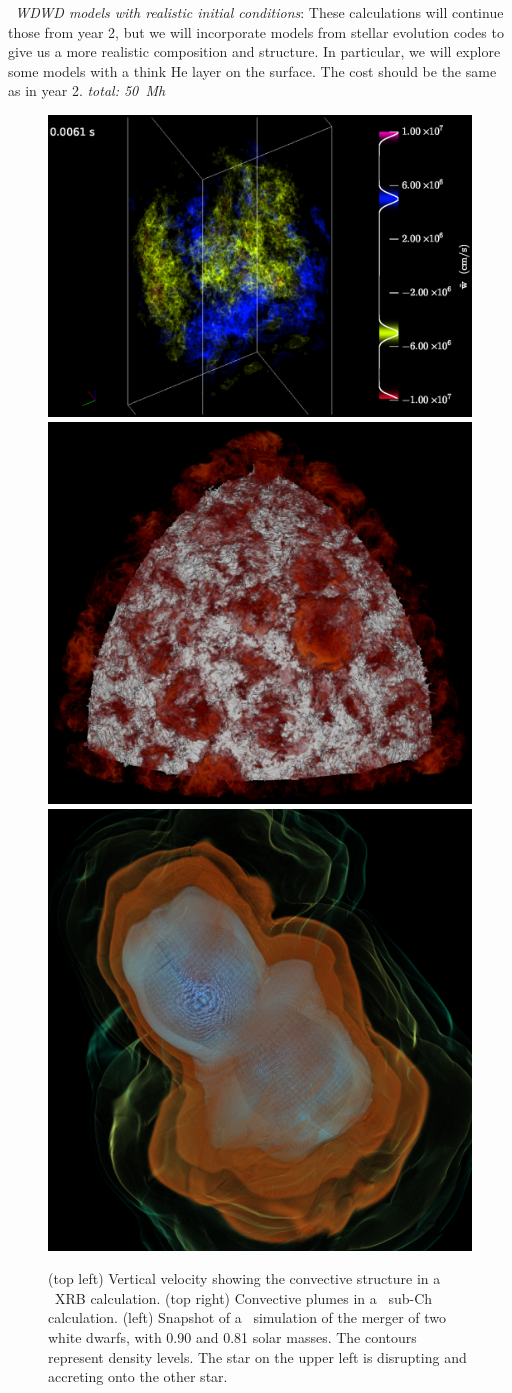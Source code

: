 \begin{tightitem}
\begin{tightitem}
\item {\em \castro\ WDWD models with realistic initial conditions}:
  These calculations will continue those from year 2, but we will incorporate
  models from stellar evolution codes to give us a more realistic 
  composition and structure.  In particular, we will explore some models
  with a think He layer on the surface.  The cost should be the same
  as in year 2.  {\em total: 50~Mh}

\end{tightitem}
%
\end{tightitem}

\begin{figure}[t]
\centering
\includegraphics[width=0.42\linewidth]{xrb_vol_vz}
\hspace{0.25em}
\includegraphics[width=0.32\linewidth]{ConvPlumes} \\[0.1em]
\includegraphics[width=0.3\linewidth]{generic3plt00180}\hspace{0.5em}
\begin{minipage}[b]{0.44\linewidth}
\caption{\label{fig:current-runs} (top left) Vertical velocity showing the
  convective structure in a \maestro\ XRB calculation.  (top right)
  Convective plumes in a \maestro\ sub-Ch calculation.  (left)
  Snapshot of a \castro\ simulation of the merger of two white dwarfs,
  with 0.90 and 0.81 solar masses. The contours represent density
  levels. The star on the upper left is disrupting and accreting onto
  the other star.}
\end{minipage}
\end{figure}


